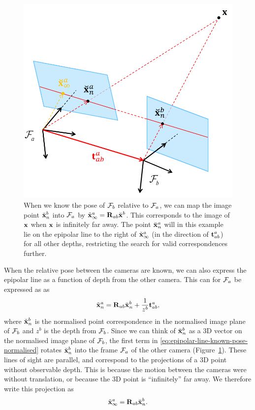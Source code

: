 \begin{figure}[htb]
    \centering
    \includegraphics[width=0.6\columnwidth]{figures/epipolar-known-pose.png}
    \caption{When we know the pose of $\mathcal{F}_b$ relative to $\mathcal{F}_a$, we can map the image point $\breve{{\boldsymbol{\mathbf{x}}}}^b_n$ into $\mathcal{F}_a$ by $\tilde{{\boldsymbol{\mathbf{x}}}}^a_{\infty} = {\boldsymbol{\mathbf{R}}}_{ab} \breve{{\boldsymbol{\mathbf{x}}}}^b$.
    This corresponds to the image of ${\boldsymbol{\mathbf{x}}}$ when ${\boldsymbol{\mathbf{x}}}$ is infinitely far away.
    The point $\breve{{\boldsymbol{\mathbf{x}}}}^a_n$ will in this example lie on the epipolar line to the right of $\tilde{{\boldsymbol{\mathbf{x}}}}^a_{\infty}$ (in the direction of ${\boldsymbol{\mathbf{t}}}^a_{ab}$) for all other depths, restricting the search for valid correspondences further.
    }
    \label{fig:epipolar-known-pose}
\end{figure}
When the relative pose between the cameras are known, we can also express the epipolar line as a function of depth from the other camera.
This can for $\mathcal{F}_a$ be expressed as as
\begin{equation} \label{eq:epipolar-line-known-pose-normalised}
  \tilde{{\boldsymbol{\mathbf{x}}}}^a_n = {\boldsymbol{\mathbf{R}}}_{ab} \breve{{\boldsymbol{\mathbf{x}}}}^b_n + \frac{1}{z^b} {\boldsymbol{\mathbf{t}}}^a_{ab},
\end{equation}
where $\breve{{\boldsymbol{\mathbf{x}}}}^b_n$ is the normalised point correspondence in the normalised image plane of $\mathcal{F}_b$ and $z^b$ is the depth from $\mathcal{F}_b$.
Since we can think of $\breve{{\boldsymbol{\mathbf{x}}}}^b_n$ as a 3D vector on the normalised image plane of $\mathcal{F}_b$, the first term in \eqref{eq:epipolar-line-known-pose-normalised} rotates $\breve{{\boldsymbol{\mathbf{x}}}}^b_n$ into the frame $\mathcal{F}_a$ of the other camera (Figure~\ref{fig:epipolar-known-pose}).
These lines of sight are parallel, and correspond to the projections of a 3D point without observable depth.
This is because the motion between the cameras were without translation, or because the 3D point is ``infinitely'' far away.
We therefore write this projection as
\begin{equation}
  \tilde{{\boldsymbol{\mathbf{x}}}}^a_{\infty} = {\boldsymbol{\mathbf{R}}}_{ab} \breve{{\boldsymbol{\mathbf{x}}}}^b_n.
\end{equation}


